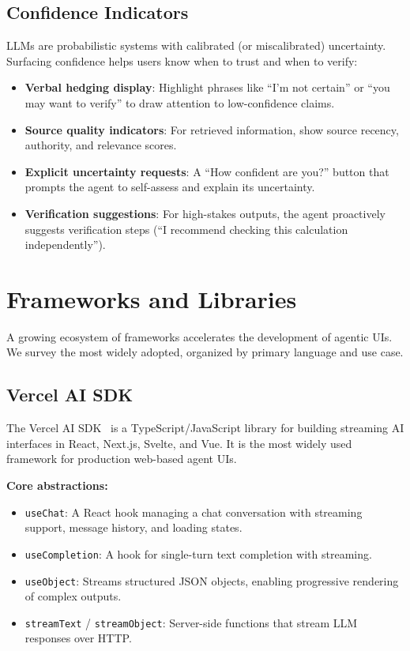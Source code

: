 \subsection{Confidence Indicators}
\label{confidence-indicators}

LLMs are probabilistic systems with calibrated (or miscalibrated) uncertainty. Surfacing confidence helps users know when to trust and when to verify:

\begin{itemize}
  \item \textbf{Verbal hedging display}: Highlight phrases like ``I’m not certain'' or ``you may want to verify'' to draw attention to low-confidence claims.
  \item \textbf{Source quality indicators}: For retrieved information, show source recency, authority, and relevance scores.
  \item \textbf{Explicit uncertainty requests}: A ``How confident are you?'' button that prompts the agent to self-assess and explain its uncertainty.
  \item \textbf{Verification suggestions}: For high-stakes outputs, the agent proactively suggests verification steps (``I recommend checking this calculation independently'').
\end{itemize}

\section{Frameworks and Libraries}
\label{subsec:ui-frameworks}

A growing ecosystem of frameworks accelerates the development of agentic UIs. We survey the most widely adopted, organized by primary language and use case.

\subsection{Vercel AI SDK}
\label{vercel-ai-sdk}

The Vercel AI SDK~\cite{vercel2024aisdk} is a TypeScript/JavaScript library for building streaming AI interfaces in React, Next.js, Svelte, and Vue. It is the most widely used framework for production web-based agent UIs.

\textbf{Core abstractions:}

\begin{itemize}
  \item \texttt{useChat}: A React hook managing a chat conversation with streaming support, message history, and loading states.
  \item \texttt{useCompletion}: A hook for single-turn text completion with streaming.
  \item \texttt{useObject}: Streams structured JSON objects, enabling progressive rendering of complex outputs.
  \item \texttt{streamText} / \texttt{streamObject}: Server-side functions that stream LLM responses over HTTP.
\end{itemize}

